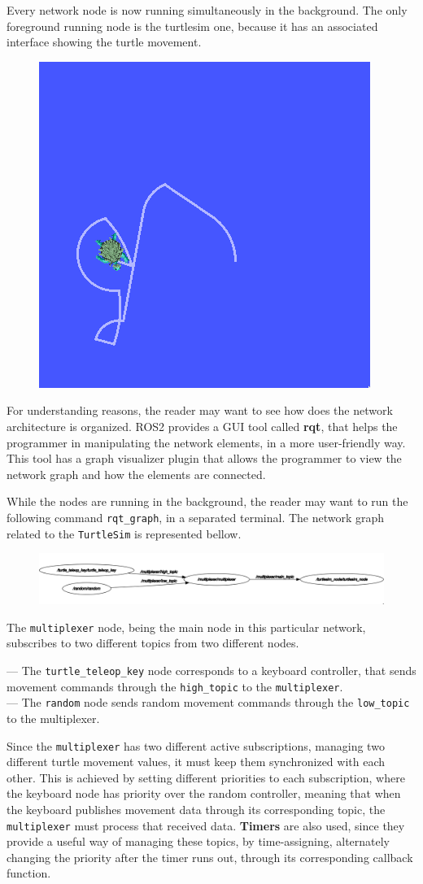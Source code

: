 Every network node is now running simultaneously in the background. The only foreground running node is the turtlesim one, because it has an associated interface showing the turtle movement.

\begin{figure}[H]
        \centering
        \includegraphics[width=0.3\linewidth]{images/ts_turtle.png}
\end{figure}

For understanding reasons, the reader may want to see how does the network architecture is organized. ROS2 provides a GUI tool called \textbf{rqt}, that helps the programmer in manipulating the network elements, in a more user-friendly way. This tool has a graph visualizer plugin that allows the programmer to view the network graph and how the elements are connected.

While the nodes are running in the background, the reader may want to run the following command \texttt{rqt\_graph}, in a separated terminal. The network graph related to the \texttt{TurtleSim} is represented bellow.

\begin{figure}[H]
        \centering
         \includegraphics[width=\linewidth]{images/ts_rqt_graph.png}
\end{figure}

The \texttt{multiplexer} node, being the main node in this particular network, subscribes to two different topics from two different nodes.

--- The \texttt{turtle\_teleop\_key} node corresponds to a keyboard controller, that sends movement commands through the \texttt{high\_topic} to the \texttt{multiplexer}.\\
--- The \texttt{random} node sends random movement commands through the \texttt{low\_topic} to the multiplexer.

Since the \texttt{multiplexer} has two different active subscriptions, managing two different turtle movement values, it must keep them synchronized with each other. This is achieved by setting different priorities to each subscription, where the keyboard node has priority over the random controller, meaning that when the keyboard publishes movement data through its corresponding topic, the \texttt{multiplexer} must process that received data. \textbf{Timers} are also used, since they provide a useful way of managing these topics, by time-assigning, alternately changing the priority after the timer runs out, through its corresponding callback function.

